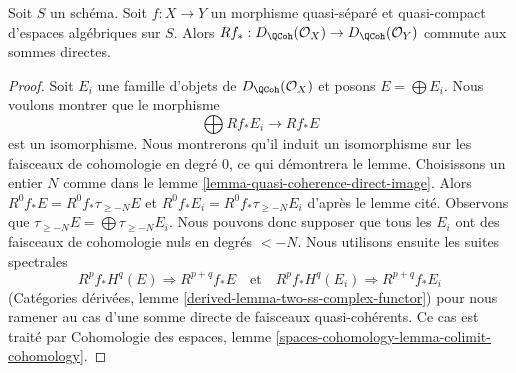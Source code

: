 \begin{lemma}
\label{lemma-quasi-coherence-pushforward-direct-sums}
Soit $S$ un schéma. Soit $f : X \to Y$ un morphisme quasi-séparé et
quasi-compact d'espaces algébriques sur $S$. Alors
$Rf_* : D_\QCoh(\mathcal{O}_X) \to D_\QCoh(\mathcal{O}_Y)$
commute aux sommes directes.
\end{lemma}

\begin{proof}
Soit $E_i$ une famille d'objets de $D_\QCoh(\mathcal{O}_X)$
et posons $E = \bigoplus E_i$. Nous voulons montrer que le morphisme
$$
\bigoplus Rf_*E_i \longrightarrow Rf_*E
$$
est un isomorphisme. Nous montrerons qu'il induit un isomorphisme sur
les faisceaux de cohomologie en degré $0$, ce qui démontrera le lemme.
Choisissons un entier $N$ comme dans le lemme \ref{lemma-quasi-coherence-direct-image}.
Alors $R^0f_*E = R^0f_*\tau_{\geq -N}E$ et
$R^0f_*E_i = R^0f_*\tau_{\geq -N}E_i$ d'après le lemme cité. Observons que
$\tau_{\geq -N}E = \bigoplus \tau_{\geq -N}E_i$.
Nous pouvons donc supposer que tous les $E_i$ ont des faisceaux de cohomologie nuls
en degrés $< -N$. Nous utilisons ensuite les suites spectrales
$$
R^pf_*H^q(E) \Rightarrow R^{p + q}f_*E
\quad\text{et}\quad
R^pf_*H^q(E_i) \Rightarrow R^{p + q}f_*E_i
$$
(Catégories dérivées, lemme \ref{derived-lemma-two-ss-complex-functor})
pour nous ramener au cas d'une somme directe de faisceaux quasi-cohérents.
Ce cas est traité par
Cohomologie des espaces, lemme \ref{spaces-cohomology-lemma-colimit-cohomology}.
\end{proof}

